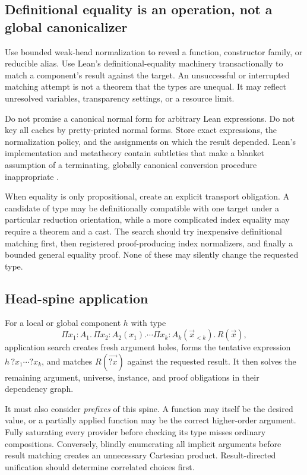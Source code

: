 \documentclass[11pt,letterpaper]{article}
\newcommand{\code}[1]{\texttt{\detokenize{#1}}}
\theoremstyle{definition}
\theoremstyle{remark}
\begin{document}
\subsection{Definitional equality is an operation, not a global canonicalizer}

Use bounded weak-head normalization to reveal a function, constructor family, or reducible alias. Use Lean's definitional-equality machinery transactionally to match a component's result against the target. An unsuccessful or interrupted matching attempt is not a theorem that the types are unequal. It may reflect unresolved variables, transparency settings, or a resource limit.

Do not promise a canonical normal form for arbitrary Lean expressions. Do not key all caches by pretty-printed normal forms. Store exact expressions, the normalization policy, and the assignments on which the result depended. Lean's implementation and metatheory contain subtleties that make a blanket assumption of a terminating, globally canonical conversion procedure inappropriate \cite{leanmanual}.

When equality is only propositional, create an explicit transport obligation. A candidate of type \code{Vec alpha (n + 0)} may be definitionally compatible with one target under a particular reduction orientation, while a more complicated index equality may require a theorem and a cast. The search should try inexpensive definitional matching first, then registered proof-producing index normalizers, and finally a bounded general equality proof. None of these may silently change the requested type.

\subsection{Head-spine application}

For a local or global component $h$ with type
\[
 \Pi x_1:A_1.\,\Pi x_2:A_2(x_1).\cdots\Pi x_k:A_k(\vec x_{<k}).\,R(\vec x),
\]
application search creates fresh argument holes, forms the tentative expression $h\,?x_1\cdots?x_k$, and matches $R(\vec{?x})$ against the requested result. It then solves the remaining argument, universe, instance, and proof obligations in their dependency graph.

It must also consider \emph{prefixes} of this spine. A function may itself be the desired value, or a partially applied function may be the correct higher-order argument. Fully saturating every provider before checking its type misses ordinary compositions. Conversely, blindly enumerating all implicit arguments before result matching creates an unnecessary Cartesian product. Result-directed unification should determine correlated choices first.
\end{document}

